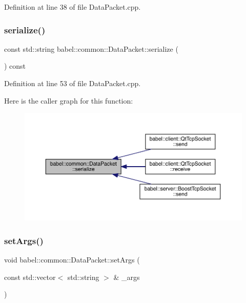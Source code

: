 Definition at line 38 of file Data\+Packet.\+cpp.

\mbox{\label{classbabel_1_1common_1_1_data_packet_a5b7325b86634dfc305bcc102bfc95636}} 
\subsubsection{\texorpdfstring{serialize()}{serialize()}}
{\footnotesize\ttfamily const std\+::string babel\+::common\+::\+Data\+Packet\+::serialize (\begin{DoxyParamCaption}{ }\end{DoxyParamCaption}) const}



Definition at line 53 of file Data\+Packet.\+cpp.

Here is the caller graph for this function\+:\nopagebreak
\begin{figure}[H]
\begin{center}
\leavevmode
\includegraphics[width=350pt]{classbabel_1_1common_1_1_data_packet_a5b7325b86634dfc305bcc102bfc95636_icgraph}
\end{center}
\end{figure}
\mbox{\label{classbabel_1_1common_1_1_data_packet_aa81d00824a4e02c4800cb0f98a054527}} 
\subsubsection{\texorpdfstring{set\+Args()}{setArgs()}}
{\footnotesize\ttfamily void babel\+::common\+::\+Data\+Packet\+::set\+Args (\begin{DoxyParamCaption}\item[{const std\+::vector$<$ std\+::string $>$ \&}]{\+\_\+args }\end{DoxyParamCaption})}



